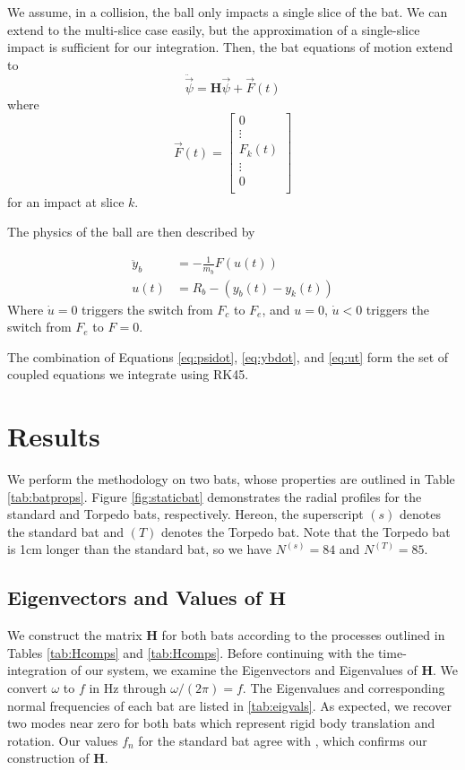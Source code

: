 \documentclass[linenumbers]{aastex7}
\begin{document}
We assume, in a collision, the ball only impacts a single slice of the bat. We can extend to the multi-slice case easily, but the approximation of a single-slice impact is sufficient for our integration. Then, the bat equations of motion extend to
\begin{equation}
    \ddot{\vec{\psi}} = \mathbf{H} \vec{\psi} + \vec{F}(t) \label{eq:psidot}
\end{equation}
where
\begin{equation*}
    \vec{F}(t) = \begin{bmatrix}
        0 \\ \vdots \\ F_k(t) \\ \vdots\\ 0 \\
    \end{bmatrix}
\end{equation*}
for an impact at slice $k$. 

The physics of the ball are then described by

\begin{align}
    \ddot{y}_b &= -\frac{1}{m_b}F(u(t)) \label{eq:ybdot}\\
    u(t) &= R_b - (y_b(t) - y_k(t)) \label{eq:ut}
\end{align}
Where $\dot{u} = 0$ triggers the switch from $F_c$ to $F_e$, and $u = 0$, $\dot{u} < 0$ triggers the switch from $F_e$ to $F = 0$.

The combination of Equations \ref{eq:psidot}, \ref{eq:ybdot}, and \ref{eq:ut} form the set of coupled equations we integrate using RK45. 
\section{Results}
We perform the methodology on two bats, whose properties are outlined in Table \ref{tab:batprops}. Figure \ref{fig:staticbat} demonstrates the radial profiles for the standard and Torpedo bats, respectively. Hereon, the superscript $(s)$ denotes the standard bat and $(T)$ denotes the Torpedo bat. Note that the Torpedo bat is 1cm longer than the standard bat, so we have $N^{(s)} = 84$ and $N^{(T)} = 85$.


\subsection{Eigenvectors and Values of \texorpdfstring{$\mathbf{H}$}{H}}
We construct the matrix $\mathbf{H}$ for both bats according to the processes outlined in Tables \ref{tab:Hcomps} and \ref{tab:Hcomps}. Before continuing with the time-integration of our system, we examine the Eigenvectors and Eigenvalues of $\mathbf{H}$. We convert $\omega$ to $f$ in Hz through $\omega / (2\pi) = f$. The Eigenvalues and corresponding normal frequencies of each bat are listed in \ref{tab:eigvals}. As expected, we recover two modes near zero for both bats which represent rigid body translation and rotation. Our values $f_n$ for the standard bat agree with \citet{nathanDynamicsBaseballBat2000a}, which confirms our construction of $\mathbf{H}$.
\end{document}
